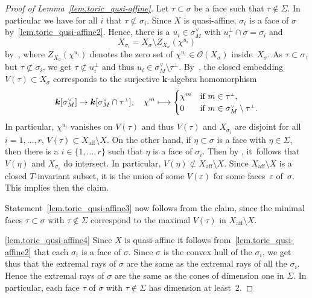 \documentclass[JEP,XML,SOM,Unicode]{cedram}
\let\mathcal\mathscr
\def\mto{\mathchoice{\longmapsto}{\mapsto}{\mapsto}{\mapsto}}
\let\oldvee\vee
\renewcommand{\vee}{{\scriptscriptstyle\oldvee}}
\let\oldbot\bot
\renewcommand{\bot}{{\scriptscriptstyle\oldbot}}
\theoremstyle{plain}
\theoremstyle{definition}
\DeclareMathOperator{\aff}{aff}
\newcommand{\OO}{\mathcal{O}}
\newcommand{\kk}{{\boldsymbol{k}}}
\begin{document}
\begin{proof}[Proof of Lemma~\ref{lem.toric_qusi-affine}]
Let $\tau \subset \sigma$ be a face such that
$\tau \not\in \Sigma$. In particular we have for all $i$ that $\tau \not\subset \sigma_i$.
Since $X$ is quasi-affine, $\sigma_i$ is a face of $\sigma$ by~\eqref{lem.toric_qusi-affine2}.
Hence, there is a $u_i \in \sigma^\vee_M$ with $u_i^\bot \cap \sigma = \sigma_i$ and
\[
X_{\sigma_i} = X_\sigma \setminus Z_{X_{\sigma}}(\chi^{u_i})
\]
by~\cite[\S1.3 Lem.]{Fu1993Introduction-to-to}, where $Z_{X_{\sigma}}(\chi^{u_i})$ denotes
the zero set of $\chi^{u_i} \in \OO(X_{\sigma})$ inside~$X_{\sigma}$.
As $\tau \subset \sigma$, but $\tau \not\subset \sigma_i$, we get
$\tau \not\subset u_i^\bot$ and thus $u_i \in \sigma_M^\vee \setminus \tau^\bot$.
By~\cite[\S3.1]{Fu1993Introduction-to-to}, the
closed embedding $V(\tau) \subset X_\sigma$ corresponds to the surjective $\kk$-algebra homomorphism
\[
\kk[\sigma^{\vee}_M] \to \kk[\sigma^{\vee}_M \cap \tau^{\bot}],
\quad
\chi^m \mto \begin{cases}
\chi^m & \textrm{if $m \in \tau^{\bot}$}, \\
0 & \textrm{if $m \in \sigma_M^\vee \setminus \tau^\bot$}.
\end{cases}
\]
In particular, $\chi^{u_i}$ vanishes on $V(\tau)$ and thus $V(\tau)$
and $X_{\sigma_i}$ are disjoint for all $i=1, \ldots, r$,
\ie $V(\tau) \subset X_{\aff} \setminus X$.
On the other hand, if $\eta \subset \sigma$ is a face with $\eta \in \Sigma$, then there is a
$i \in \{1, \ldots, r\}$ such that $\eta$ is a face of $\sigma_i$. Then by
\cite[\S3.1, p.\,53]{Fu1993Introduction-to-to},
it~follows that $V(\eta)$ and $X_{\sigma_i}$ do intersect. In particular,
$V(\eta) \not\subset X_{\aff} \setminus X$.
Since $X_{\aff} \setminus X$ is a closed $T$-invariant subset,
it is the union of some $V(\varepsilon)$ for some faces~$\varepsilon$ of~$\sigma$.
This implies then the claim.

Statement~\eqref{lem.toric_qusi-affine3} now follows from the claim,
since the minimal faces $\tau \subset \sigma$ with $\tau \not\in \Sigma$
correspond to the maximal $V(\tau)$ in $X_{\aff} \setminus X$.

\eqref{lem.toric_qusi-affine4}
Since $X$ is quasi-affine it follows from~\eqref{lem.toric_qusi-affine2}
that each $\sigma_i$ is a face of $\sigma$. Since $\sigma$ is the convex hull of the $\sigma_i$,
we get thus that the extremal rays of $\sigma$ are the same as the extremal rays of all the $\sigma_i$.
Hence the extremal rays of $\sigma$ are the same as the cones of dimension one in $\Sigma$. In particular,
each face $\tau$ of $\sigma$ with $\tau \not\in \Sigma$ has dimension at least~$2$.
\end{proof}
\end{document}
